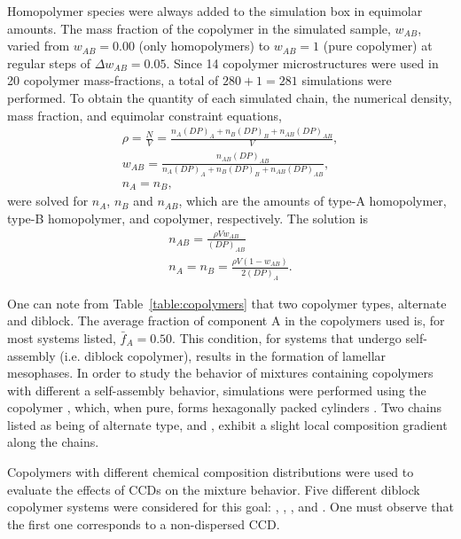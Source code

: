 \documentclass[
journal=mamobx,
manuscript=article,
]{achemso}
\begin{document}
Homopolymer species were always added to the simulation box in equimolar amounts.
The mass fraction of the copolymer in the simulated sample, $w_{AB}$, varied from $w_{AB} = 0.00$ (only homopolymers) to $w_{AB} = 1$ (pure copolymer) at regular steps of $\Delta w_{AB} = 0.05$.
Since 14 copolymer microstructures were used in 20 copolymer mass-fractions, a total of $280 + 1 = 281$ simulations were performed.
To obtain the quantity of each simulated chain, the numerical density, mass fraction, and equimolar constraint equations,
\begin{gather}
\rho = \frac{N}{V} = \frac{n_A(DP)_A+n_B(DP)_B+n_{AB}(DP)_{AB}}{V}, \\
w_{AB} = \frac{n_{AB}(DP)_{AB}}{n_A(DP)_A+n_B(DP)_B+n_{AB}(DP)_{AB}}, \\
n_A = n_B,
\end{gather}
were solved for $n_A$, $n_B$ and $n_{AB}$, which are the amounts of type-A homopolymer, type-B homopolymer, and copolymer, respectively.
The solution is
\begin{gather}
n_{AB} = \frac{\rho V w_{AB}}{(DP)_{AB}}\\
n_A = n_B = \frac{\rho V (1 - w_{AB})}{2 (DP)_A}.
\end{gather}

One can note from Table~\ref{table:copolymers} that two copolymer types, alternate and diblock.
The average fraction of component A in the copolymers used is, for most systems listed, $\bar{f}_A = 0.50 $.
This condition, for systems that undergo self-assembly (i.e. diblock copolymer), results in the formation of lamellar mesophases. 
In order to study the behavior of mixtures containing copolymers with different a self-assembly behavior, simulations were performed using the copolymer , which, when pure, forms hexagonally packed cylinders \cite{Groot_1998, Bates_1990, Gavrilov_2013, Lemos_2020}.
Two chains listed as being of alternate type,  and , exhibit a slight local composition gradient along the chains.

Copolymers with different chemical composition distributions were used to evaluate the effects of CCDs on the mixture behavior.
Five different diblock copolymer systems were considered for this goal: , , ,  and .
One must observe that the first one corresponds to a non-dispersed CCD.
\end{document}
